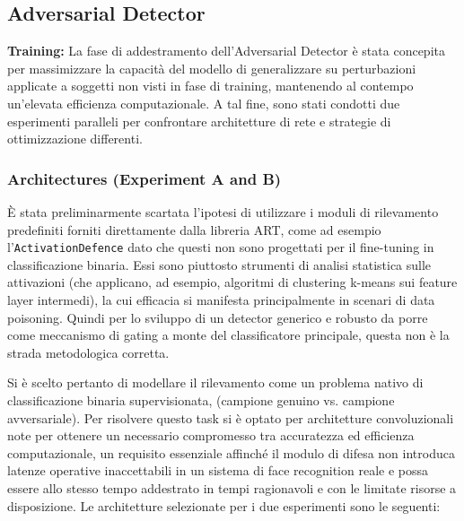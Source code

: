 \documentclass[a4paper, 12pt]{article}
\begin{document}
\vspace{15pt}


\subsection{Adversarial Detector}
\vspace{5pt}

\textbf{Training:}
La fase di addestramento dell'Adversarial Detector è stata concepita per massimizzare la capacità del modello di 
generalizzare su perturbazioni applicate a soggetti non visti in fase di training, mantenendo al contempo 
un'elevata efficienza computazionale. A tal fine, sono stati condotti due esperimenti paralleli per 
confrontare architetture di rete e strategie di ottimizzazione differenti.

\vspace{10pt} 

\subsubsection{Architectures (Experiment A and B)}

È stata preliminarmente scartata l'ipotesi di utilizzare i moduli di rilevamento 
predefiniti forniti direttamente dalla libreria ART, come ad esempio l'\texttt{ActivationDefence} dato che questi
non sono progettati per il fine-tuning in classificazione binaria. Essi sono piuttosto strumenti di analisi statistica sulle 
attivazioni (che applicano, ad esempio, algoritmi di clustering k-means sui feature layer intermedi), la cui efficacia 
si manifesta principalmente in scenari di data poisoning. 
Quindi per lo sviluppo di un detector generico e robusto da porre come meccanismo di gating a monte del 
classificatore principale, questa non è la strada metodologica corretta.

Si è scelto pertanto di modellare il rilevamento come un problema nativo di classificazione binaria supervisionata, 
(campione genuino vs. campione avversariale). Per risolvere questo task si è optato per architetture convoluzionali
note per ottenere un necessario compromesso tra accuratezza ed efficienza computazionale, un requisito essenziale affinché 
il modulo di  difesa non introduca latenze operative inaccettabili in un sistema di face recognition reale e possa essere
allo stesso tempo addestrato in tempi ragionavoli e con le limitate risorse a disposizione. Le architetture selezionate 
per i due esperimenti sono le seguenti:
\end{document}
